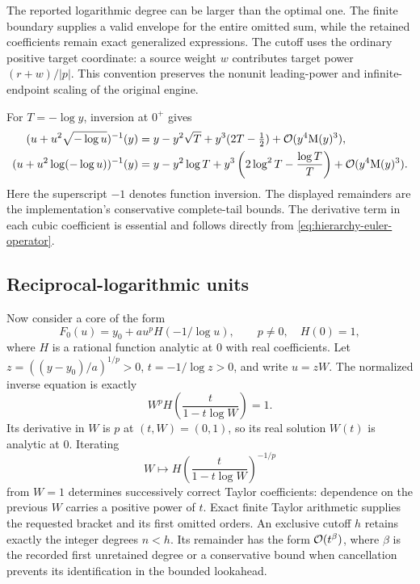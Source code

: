 The reported logarithmic degree can be larger than the optimal one. The
finite boundary supplies a valid envelope for the entire omitted sum,
while the retained coefficients remain exact generalized expressions.
The cutoff uses the ordinary positive target coordinate: a source weight
$w$ contributes target power $(r+w)/|p|$. This convention preserves the
nonunit leading-power and infinite-endpoint scaling of the original engine.

\begin{example}
For $T=-\log y$, inversion at $0^+$ gives
\begin{align}
 (u+u^2\sqrt{-\log u})^{-1}(y)
 &=y-y^2\sqrt T+y^3(2T-\tfrac12)+\mathcal O(y^4\mathrm M(y)^3),
 \label{eq:inverse-sqrt-log-coefficient}\\
 (u+u^2\log(-\log u))^{-1}(y)
 &=y-y^2\log T
 +y^3\left(2\log^2T-\frac{\log T}{T}\right)
 +\mathcal O(y^4\mathrm M(y)^3).
 \label{eq:inverse-iterated-log-coefficient}
\end{align}
Here the superscript $-1$ denotes function inversion. The displayed
remainders are the implementation's conservative complete-tail bounds.
The derivative term in each cubic coefficient is essential and follows
directly from \eqref{eq:hierarchy-euler-operator}.
\end{example}

\subsection{Reciprocal-logarithmic units}

Now consider a core of the form
\begin{equation}
 F_0(u)=y_0+a u^p H(-1/\log u),
 \qquad p\ne0,\quad H(0)=1,
 \label{eq:reciprocal-log-core}
\end{equation}
where $H$ is a rational function analytic at $0$ with real coefficients.
Let $z=((y-y_0)/a)^{1/p}>0$, $t=-1/\log z>0$, and write $u=zW$.
The normalized inverse equation is exactly
\begin{equation}
 W^p H\left(\frac{t}{1-t\log W}\right)=1.
 \label{eq:reciprocal-log-unit-equation}
\end{equation}
Its derivative in $W$ is $p$ at $(t,W)=(0,1)$, so its real solution
$W(t)$ is analytic at $0$. Iterating
\begin{equation}
 W\longmapsto
 H\left(\frac{t}{1-t\log W}\right)^{-1/p}
 \label{eq:reciprocal-log-fixed-point}
\end{equation}
from $W=1$ determines successively correct Taylor coefficients: dependence
on the previous $W$ carries a positive power of $t$. Exact finite Taylor
arithmetic supplies the requested bracket and its first omitted orders.
An exclusive cutoff $h$ retains exactly the integer degrees $n<h$.
Its remainder has the form $\mathcal O(t^\beta)$, where $\beta$ is the recorded
first unretained degree or a conservative bound when cancellation prevents
its identification in the bounded lookahead.

